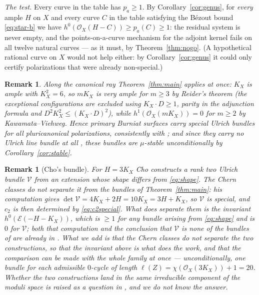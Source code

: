 \documentclass[10pt,a4paper]{amsart}
\newtheorem{remark}[theorem]{Remark}
\newcommand{\OO}{\mathcal{O}}
\newcommand{\EE}{\mathcal{E}}
\newcommand{\len}{\ell}
\begin{document}
\smallskip
\noindent \emph{The test.} Every curve in the table has $p_a\ge1$. By Corollary~\ref{cor:genus}, for \emph{every} ample $H$ on $X$ and every curve $C$ in the table satisfying the B\'ezout bound \eqref{eq:star-b} we have $h^0(\OO_X(H-C))\ge p_a(C)\ge1$: the residual system is never empty, and the points-on-a-curve mechanism for the adjoint kernel fails on all twelve natural curves --- as it must, by Theorem~\ref{thm:nogo}. (A hypothetical rational curve on $X$ would not help either: by Corollary~\ref{cor:genus} it could only certify polarizations that were already non-special.)

\begin{remark}\label{rem:burniat-positive}
Along the canonical ray Theorem~\ref{thm:main} applies at once: $K_X$ is ample with $K_X^2=6$, so $mK_X$ is very ample for $m\ge3$ by Reider's theorem (the exceptional configurations are excluded using $K_X\cdot D\ge1$, parity in the adjunction formula and $D^2K_X^2\le(K_X\cdot D)^2$), while $h^1(\OO_X(mK_X))=0$ for $m\ge2$ by Kawamata--Viehweg. Hence primary Burniat surfaces carry special Ulrich bundles for all pluricanonical polarizations, consistently with \cite{Cas22}; and since they carry no Ulrich line bundle at all \cite{Cho26}, these bundles are $\mu$-stable unconditionally by Corollary~\ref{cor:stable}.
\end{remark}

\begin{remark}[Cho's bundle]\label{rem:cho}
For $H=3K_X$ Cho \cite[Thm.~5.6]{Cho26} constructs a rank two Ulrich bundle $\mathcal{V}$ from an extension whose shape differs from \eqref{eq:shape}. The Chern classes do not separate it from the bundles of Theorem~\ref{thm:main}: his computation gives $\det\mathcal{V}=4K_X+2H=10K_X=3H+K_X$, so $\mathcal{V}$ is \emph{special}, and $c_2$ is then determined by \eqref{eq:c2special}. What does separate them is the invariant $h^0(\EE(-H-K_X))$, which is $\ge1$ for any bundle arising from \eqref{eq:shape} and is $0$ for $\mathcal{V}$; both that computation and the conclusion that $\mathcal V$ is none of the bundles of \cite{Cas17} are already in \cite[Rem.~5.7]{Cho26}. What we add is that the Chern classes do not separate the two constructions, so that the invariant above is what does the work, and that the comparison can be made with the whole family at once --- unconditionally, one bundle for each admissible $0$-cycle of length $\len(Z)=\chi(\OO_X(3K_X))+1=20$. Whether the two constructions land in the same irreducible component of the moduli space is raised as a question in \cite[Rem.~5.7]{Cho26}, and we do not know the answer.
\end{remark}
\end{document}

